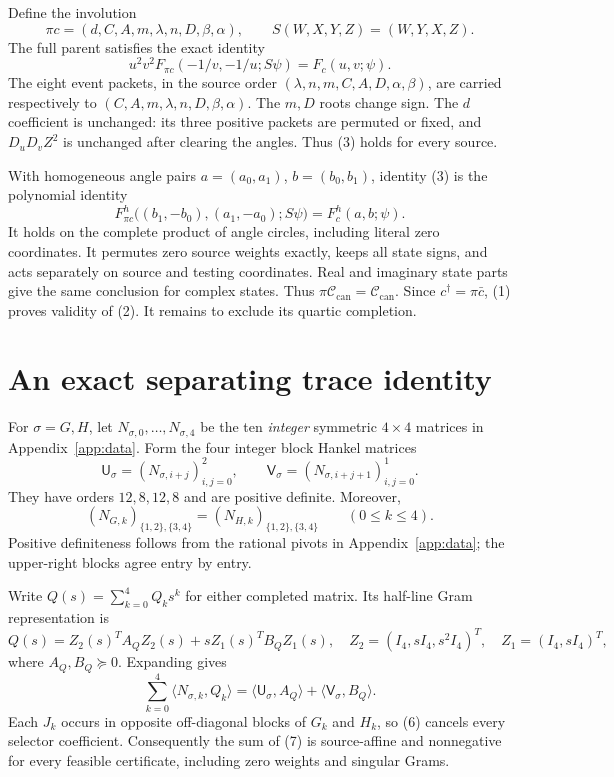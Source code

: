 \documentclass[10pt]{article}
\newcommand{\Cc}{\mathcal C_{\mathrm{can}}}
\newcommand{\ip}[2]{\langle #1,#2\rangle}
\begin{document}
Define the involution
\[
 \pi c=(d,C,A,m,\lambda,n,D,\beta,\alpha),\qquad
 S(W,X,Y,Z)=(W,Y,X,Z).
\]
The full parent satisfies the exact identity
\[
 \boxed{u^2v^2F_{\pi c}(-1/v,-1/u;S\psi)=F_c(u,v;\psi).} \tag{3}
\]
The eight event packets, in the source
order $(\lambda,n,m,C,A,D,\alpha,\beta)$, are carried respectively to
$(C,A,m,\lambda,n,D,\beta,\alpha)$. The $m,D$ roots change sign.
The $d$ coefficient is unchanged: its three positive packets are permuted
or fixed, and $D_uD_vZ^2$ is unchanged after clearing the angles.
Thus (3) holds for every source.

With homogeneous angle pairs
$a=(a_0,a_1)$, $b=(b_0,b_1)$, identity (3) is the polynomial identity
\[
 \boxed{F^h_{\pi c}\bigl((b_1,-b_0),(a_1,-a_0);S\psi\bigr)
                       =F^h_c(a,b;\psi).}                 \tag{4}
\]
It holds on the complete product of angle circles, including literal zero
coordinates. It permutes zero source weights exactly, keeps all state
signs, and acts separately on source and testing coordinates. Real and
imaginary state parts give the same conclusion for complex states.
Thus $\pi\Cc=\Cc$. Since $c^\dagger=\pi\bar c$, (1) proves validity
of (2). It remains to exclude its quartic completion.

\section{An exact separating trace identity}

For $\sigma=G,H$, let $N_{\sigma,0},\ldots,N_{\sigma,4}$ be the ten
\emph{integer} symmetric $4\times4$ matrices in Appendix~\ref{app:data}.
Form the four integer block Hankel matrices
\[
 \mathsf U_\sigma=(N_{\sigma,i+j})_{i,j=0}^{2},\qquad
 \mathsf V_\sigma=(N_{\sigma,i+j+1})_{i,j=0}^{1}.           \tag{5}
\]
They have orders $12,8,12,8$ and are positive definite. Moreover,
\[
 (N_{G,k})_{\{1,2\},\{3,4\}}
 =(N_{H,k})_{\{1,2\},\{3,4\}}
 \qquad(0\le k\le4).                                    \tag{6}
\]
Positive definiteness follows from the rational pivots in
Appendix~\ref{app:data}; the upper-right blocks agree entry by entry.

Write $Q(s)=\sum_{k=0}^4Q_ks^k$ for either completed matrix. Its
half-line Gram representation is
\[
 Q(s)=Z_2(s)^TA_QZ_2(s)+sZ_1(s)^TB_QZ_1(s),\quad
 Z_2=(I_4,sI_4,s^2I_4)^T,\quad Z_1=(I_4,sI_4)^T,
\]
where $A_Q,B_Q\succeq0$. Expanding gives
\[
 \sum_{k=0}^4\ip{N_{\sigma,k}}{Q_k}
 =\ip{\mathsf U_\sigma}{A_Q}+\ip{\mathsf V_\sigma}{B_Q}.
                                                               \tag{7}
\]
Each $J_k$ occurs in opposite off-diagonal blocks of $G_k$ and $H_k$,
so (6) cancels every selector coefficient. Consequently the sum of (7)
is source-affine and nonnegative for every feasible certificate, including
zero weights and singular Grams.
\end{document}
